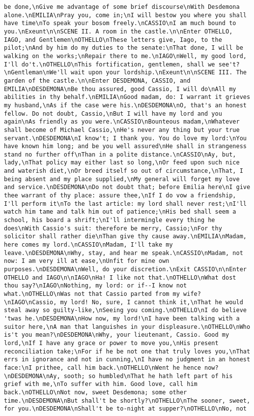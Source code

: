 \begin{verbatim}
be done,\nGive me advantage of some brief discourse\nWith Desdemona alone.\nEMILIA\nPray you, come in;\nI will bestow you where you shall have time\nTo speak your bosom freely.\nCASSIO\nI am much bound to you.\nExeunt\n\nSCENE II. A room in the castle.\n\nEnter OTHELLO, IAGO, and Gentlemen\nOTHELLO\nThese letters give, Iago, to the pilot;\nAnd by him do my duties to the senate:\nThat done, I will be walking on the works;\nRepair there to me.\nIAGO\nWell, my good lord, I'll do't.\nOTHELLO\nThis fortification, gentlemen, shall we see't?\nGentleman\nWe'll wait upon your lordship.\nExeunt\n\nSCENE III. The garden of the castle.\n\nEnter DESDEMONA, CASSIO, and EMILIA\nDESDEMONA\nBe thou assured, good Cassio, I will do\nAll my abilities in thy behalf.\nEMILIA\nGood madam, do: I warrant it grieves my husband,\nAs if the case were his.\nDESDEMONA\nO, that's an honest fellow. Do not doubt, Cassio,\nBut I will have my lord and you again\nAs friendly as you were.\nCASSIO\nBounteous madam,\nWhatever shall become of Michael Cassio,\nHe's never any thing but your true servant.\nDESDEMONA\nI know't; I thank you. You do love my lord:\nYou have known him long; and be you well assured\nHe shall in strangeness stand no further off\nThan in a polite distance.\nCASSIO\nAy, but, lady,\nThat policy may either last so long,\nOr feed upon such nice and waterish diet,\nOr breed itself so out of circumstance,\nThat, I being absent and my place supplied,\nMy general will forget my love and service.\nDESDEMONA\nDo not doubt that; before Emilia here\nI give thee warrant of thy place: assure thee,\nIf I do vow a friendship, I'll perform it\nTo the last article: my lord shall never rest;\nI'll watch him tame and talk him out of patience;\nHis bed shall seem a school, his board a shrift;\nI'll intermingle every thing he does\nWith Cassio's suit: therefore be merry, Cassio;\nFor thy solicitor shall rather die\nThan give thy cause away.\nEMILIA\nMadam, here comes my lord.\nCASSIO\nMadam, I'll take my leave.\nDESDEMONA\nWhy, stay, and hear me speak.\nCASSIO\nMadam, not now: I am very ill at ease,\nUnfit for mine own purposes.\nDESDEMONA\nWell, do your discretion.\nExit CASSIO\n\nEnter OTHELLO and IAGO\n\nIAGO\nHa! I like not that.\nOTHELLO\nWhat dost thou say?\nIAGO\nNothing, my lord: or if--I know not what.\nOTHELLO\nWas not that Cassio parted from my wife?\nIAGO\nCassio, my lord! No, sure, I cannot think it,\nThat he would steal away so guilty-like,\nSeeing you coming.\nOTHELLO\nI do believe 'twas he.\nDESDEMONA\nHow now, my lord!\nI have been talking with a suitor here,\nA man that languishes in your displeasure.\nOTHELLO\nWho is't you mean?\nDESDEMONA\nWhy, your lieutenant, Cassio. Good my lord,\nIf I have any grace or power to move you,\nHis present reconciliation take;\nFor if he be not one that truly loves you,\nThat errs in ignorance and not in cunning,\nI have no judgment in an honest face:\nI prithee, call him back.\nOTHELLO\nWent he hence now?\nDESDEMONA\nAy, sooth; so humbled\nThat he hath left part of his grief with me,\nTo suffer with him. Good love, call him back.\nOTHELLO\nNot now, sweet Desdemona; some other time.\nDESDEMONA\nBut shall't be shortly?\nOTHELLO\nThe sooner, sweet, for you.\nDESDEMONA\nShall't be to-night at supper?\nOTHELLO\nNo, not 
\end{verbatim}
